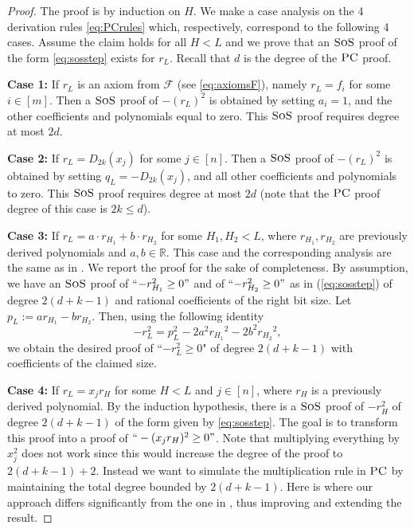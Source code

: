 \documentclass[11pt]{article}
\newcommand{\sos}{\text{\sc{SoS}}}
\newcommand{\F}{\mathcal{F}}
\newcommand{\PC}{\textsc{PC}}
\newcommand{\1}{\textbf{1}}
\newcommand\db{2(d+k-1)}
\begin{document}
\begin{proof} 
The proof is by induction on $H$. We make a case analysis on the 4 derivation rules \eqref{eq:PCrules} which, respectively, correspond to the following 4 cases. Assume the claim holds for all $H<L$ and we prove that an $\sos$ proof of the form \cref{eq:sosstep} exists for $r_L$. Recall that $d$ is the degree of the $\PC$ proof.

\textbf{Case 1:} If $r_L$ is an axiom from $\F$ (see \eqref{eq:axiomsF}), namely $r_L=f_i$ for some $i\in [m]$.
Then a $\sos$ proof of $-(r_L)^2$ is obtained by setting $a_i=1$, and the other coefficients and polynomials equal to zero. This $\sos$ proof requires degree at most $2d$.

\textbf{Case 2:} If $r_L=D_{2k}(x_j)$ for some $j\in [n]$. Then a $\sos$ proof of $-(r_L)^2$ is obtained by setting $q_L=-D_{2k}(x_j)$, and all other coefficients  and polynomials to zero. This $\sos$ proof requires degree at most $2d$ (note that the $\PC$ proof degree of this case is $2k\leq d$).

\textbf{Case 3:} If $r_L= a\cdot r_{H_1} + b\cdot r_{H_2}$ for some $H_1,H_2<L$, where $r_{H_1}, r_{H_2}$ are previously derived polynomials and $a,b\in \mathbb{R}$. This case and the corresponding analysis are the same as in \cite{berkholz18}. We report the proof for the sake of completeness. By assumption, we have an $\sos$ proof of ``$-r_{H_1}^2\geq 0"$ and of ``$-r_{H_2}^2\geq 0"$ as in (\ref{eq:sosstep}) of degree $2(d+k-1)$ and rational coefficients of the right bit size.  Let $p_L:=ar_{H_1} - br_{H_2}$. Then, using the following identity  
$$-r_L^2 = p_L^2 -2a^2{r_{H_1}}^2 -2b^2{r_{H_2}}^2,$$
we obtain the desired proof of ``$-r_L^2\geq 0$" of degree $2(d+k-1)$ with coefficients of the claimed size. 


\textbf{Case 4:} If $r_L=x_j r_H$ for some $H<L$ and $j\in [n]$, where $r_H$ is a previously derived polynomial.
By the induction hypothesis, there is a $\sos$ proof of $-r_H^2$ of degree $\db$ of the form given by \eqref{eq:sosstep}.
The goal is to transform this proof into a proof of $``-(x_j r_H)^2\geq 0"$. Note that multiplying everything by $x_j^2$ does not work since this would increase the degree of the proof to $\db+2$. Instead we want to simulate the multiplication rule in $\PC$ by maintaining the total degree bounded by $\db$. Here is where our approach differs significantly from the one in \cite{berkholz18}, thus improving and extending the result.


\end{proof}
\end{document}
